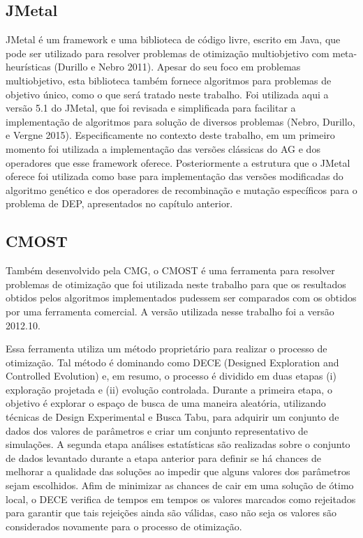 \subsection{JMetal}

JMetal é um framework e uma biblioteca de código livre, escrito em Java, que pode ser utilizado para resolver problemas de otimização multiobjetivo com meta-heurísticas (Durillo e Nebro 2011). Apesar do seu foco em problemas multiobjetivo, esta biblioteca também fornece algoritmos para problemas de objetivo único, como o que será tratado neste trabalho. Foi utilizada aqui a versão 5.1 do JMetal, que foi revisada e simplificada para facilitar a implementação de algoritmos para solução de diversos problemas (Nebro, Durillo, e Vergne 2015). Especificamente no contexto deste trabalho, em um primeiro momento foi utilizada a implementação das versões clássicas do AG e dos operadores que esse framework oferece. Posteriormente a estrutura que o JMetal oferece foi utilizada como base para implementação das versões modificadas do algoritmo genético e dos operadores de recombinação e mutação específicos para o problema de DEP, apresentados no capítulo anterior. 

\subsection{CMOST}

Também desenvolvido pela CMG, o CMOST é uma ferramenta para resolver problemas de otimização que foi utilizada neste trabalho para que os resultados obtidos pelos algoritmos implementados pudessem ser comparados com os obtidos por uma ferramenta comercial. A versão utilizada nesse trabalho foi a versão 2012.10.

Essa ferramenta utiliza um método proprietário para realizar o processo de otimização. Tal método é dominando como DECE (Designed Exploration and Controlled Evolution) e, em resumo, o processo é dividido em duas etapas (i) exploração projetada e (ii) evolução controlada. Durante a primeira etapa, o objetivo é explorar o espaço de busca de uma maneira aleatória, utilizando técnicas de Design Experimental e Busca Tabu, para adquirir um conjunto de dados dos valores de parâmetros e criar um conjunto representativo de simulações. A segunda etapa análises estatísticas são realizadas sobre o conjunto de dados levantado durante a etapa anterior para definir se há chances de melhorar a qualidade das soluções ao impedir que alguns valores dos parâmetros sejam escolhidos. Afim de minimizar as chances de cair em uma solução de ótimo local, o DECE verifica de tempos em tempos os valores marcados como rejeitados para garantir que tais rejeições ainda são válidas, caso não seja os valores são considerados novamente para o processo de otimização.

